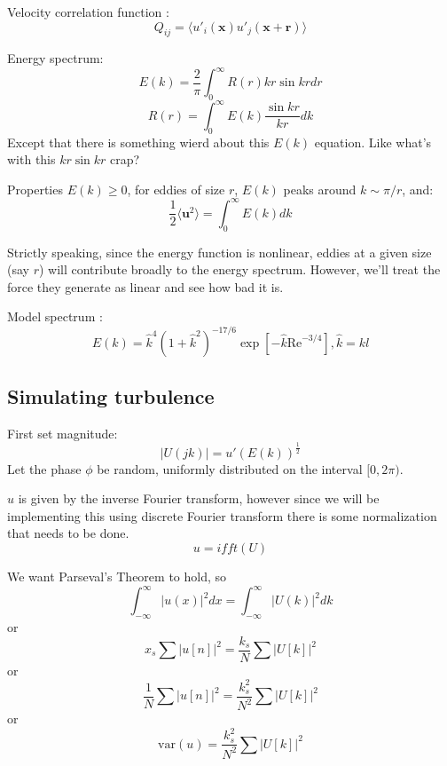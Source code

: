 Velocity correlation function \cite{Davidson:2004}:
\begin{equation}
Q_{ij} = \langle u'_i(\mathbf{x}) u'_j(\mathbf{x}+\mathbf{r}) \rangle
\end{equation}

Energy spectrum:
\begin{equation}
E(k) = \frac{2}{\pi} \int_0^\infty R(r) k r \sin{kr} dr
\end{equation}
\begin{equation}
R(r) = \int_0^\infty E(k) \frac{\sin{kr}}{kr} dk
\end{equation}
Except that there is something wierd about this $E(k)$ equation. Like what's with this $kr\sin{kr}$ crap? 

Properties $E(k)\geq 0$, for eddies of size $r$, $E(k)$ peaks around $k \sim \pi/r$, and:
\begin{equation}
\frac{1}{2}\langle \mathbf{u}^2 \rangle = \int_0^\infty E(k) dk
\end{equation}

Strictly speaking, since the energy function is nonlinear, eddies at a given size (say $r$) will contribute broadly to the energy spectrum.  However, we'll treat the force they generate as linear and see how bad it is. 

Model spectrum \cite{Davidson:2004}:
\begin{equation}
E(k) = \hat{k}^4 (1+\hat{k}^2)^{-17/6} \exp{[-\hat{k} \mbox{Re}^{-3/4}]}, \hat{k} = kl
\end{equation}

\subsection{Simulating turbulence}

First set magnitude:
\begin{equation}
|U(jk)| = u' \left( E(k) \right)^{\frac{1}{2}}
\end{equation}
Let the phase $\phi$ be random, uniformly distributed on the interval $[0,2\pi)$.

$u$ is given by the inverse Fourier transform, however since we will be implementing this using discrete Fourier transform there is some normalization that needs to be done. 
\begin{equation}
u = ifft(U)
\end{equation}

We want Parseval's Theorem to hold, so 
\begin{equation}
\int_{-\infty}^\infty |u(x)|^2 dx 
=
\int_{-\infty}^\infty |U(k)|^2 dk
\end{equation}
or
\begin{equation}
x_s \sum |u[n]|^2 
=
\frac{k_s}{N} \sum |U[k]|^2
\end{equation}
or
\begin{equation}
\frac{1}{N} \sum |u[n]|^2 
=
\frac{k_s^2}{N^2} \sum |U[k]|^2
\end{equation}
or
\begin{equation}
\mbox{var}(u) 
=
\frac{k_s^2}{N^2} \sum |U[k]|^2
\end{equation}

